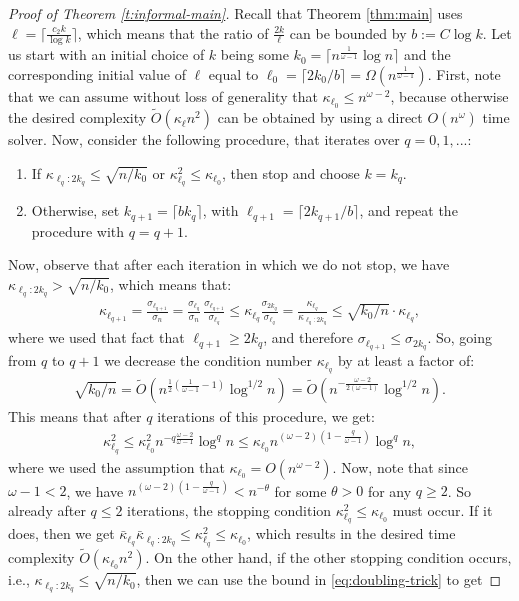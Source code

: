 \documentclass[11pt]{article}
\begin{document}
\begin{proof}[Proof of Theorem \ref{t:informal-main}]
Recall that Theorem \ref{thm:main} uses $\ell=\lceil\frac{c_2 k}{\log k}\rceil$, which means that the ratio of $\frac {2k}{\ell}$ can be bounded by $b := C\log k$. Let us start with an initial choice of $k$ being some $k_0 = \lceil n^{\frac1{\omega-1}}\log n\rceil$ and the corresponding initial value of $\ell$ equal to $\ell_0= \lceil 2k_0/b\rceil =\Omega(n^{\frac1{\omega-1}})$. First, note that we can assume without loss of generality that $\kappa_{\ell_0} \leq n^{\omega-2}$, because otherwise the desired complexity $\tilde O(\kappa_\ell n^2)$ can be obtained by using a direct $O(n^\omega)$ time solver. Now, consider the following procedure, that iterates over $q=0,1,...$:
\begin{enumerate}
\item If $\kappa_{\ell_q:2k_q}\leq \sqrt{n/k_0}$ or $\kappa_{\ell_q}^2\leq \kappa_{\ell_0}$, then stop and choose $k=k_q$.
\item Otherwise, set $k_{q+1} = \lceil bk_q\rceil$, with $\ell_{q+1}=\lceil 2k_{q+1}/b\rceil$, and repeat the procedure with $q=q+1$.
\end{enumerate}
Now, observe that after each iteration in which we do not stop, we have $\kappa_{\ell_q:2k_q}>\sqrt{n/k_0}$, which means that: 
\begin{align*}
    \kappa_{\ell_{q+1}} = \frac{\sigma_{\ell_{q+1}}}{\sigma_n} = \frac{\sigma_{\ell_q}}{\sigma_n}\,
    \frac{\sigma_{\ell_{q+1}}}{\sigma_{\ell_q}}
    \leq \kappa_{\ell_q}\frac{\sigma_{2k_q}}{\sigma_{\ell_q}}=\frac{\kappa_{\ell_q}}{\kappa_{\ell_q:2k_q}}\leq \sqrt{k_0/n}\cdot \kappa_{\ell_q},
\end{align*}
where we used that fact that $\ell_{q+1}\geq 2k_q$, and therefore $\sigma_{\ell_{q+1}}\leq \sigma_{2k_q}$. So, going from $q$ to $q+1$ we decrease the condition number $\kappa_{\ell_q}$ by at least a factor of:
\begin{align*}
    \sqrt{k_0/n}= \tilde O( n^{\frac12(\frac1{\omega-1}-1)}\log^{1/2} n) = \tilde O(n^{-\frac{\omega-2}{2(\omega-1)}}\log^{1/2}n).
\end{align*}
This means that after $q$ iterations of this procedure, we get:
\begin{align*}
    \kappa_{\ell_q}^2 \leq \kappa_{\ell_0}^2n^{-q\frac{\omega-2}{\omega-1}}\log^q n
\leq\kappa_{\ell_0} n^{(\omega-2)(1-\frac q{\omega-1})}\log^q n,
\end{align*}
where we used the assumption that $\kappa_{\ell_0} = O(n^{\omega-2})$. 
Now, note that since $\omega-1< 2$, we have $n^{(\omega-2)(1-\frac q{\omega-1})}<n^{-\theta}$ for some $\theta > 0$ for any $q\geq 2$. So already after $q\leq 2$ iterations, the stopping condition $\kappa_{\ell_q}^2\leq\kappa_{\ell_0}$ must occur. If it does, then we get $\bar\kappa_{\ell_q}\bar\kappa_{\ell_q:2k_q}\leq\kappa_{\ell_q}^2\leq \kappa_{\ell_0}$, which results in the desired time complexity $\tilde O(\kappa_{\ell_0}n^2)$. On the other hand, if the other stopping condition occurs, i.e., $\kappa_{\ell_q:2k_q}\leq \sqrt{n/k_0}$, then we can use the bound in \eqref{eq:doubling-trick} to get

\end{proof}
\end{document}
